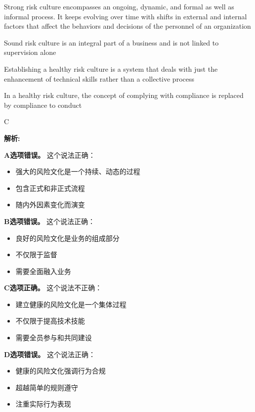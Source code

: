 \documentclass{article}
\newenvironment{explanation}
{\textbf{解析:}\par}
{\par}
\begin{document}
\begin{choices}
    \item Strong risk culture encompasses an ongoing, dynamic, and formal as well as informal process. It keeps evolving over time with shifts in external and internal factors that affect the behaviors and decisions of the personnel of an organization
    \item Sound risk culture is an integral part of a business and is not linked to supervision alone
    \item Establishing a healthy risk culture is a system that deals with just the enhancement of technical skills rather than a collective process
    \item In a healthy risk culture, the concept of complying with compliance is replaced by compliance to conduct
\end{choices}

\begin{correctanswer}
    C
\end{correctanswer}

\begin{explanation}
    \textbf{A选项错误。}
    这个说法正确：
    \begin{itemize}
        \item 强大的风险文化是一个持续、动态的过程
        \item 包含正式和非正式流程
        \item 随内外因素变化而演变
    \end{itemize}

    \textbf{B选项错误。}
    这个说法正确：
    \begin{itemize}
        \item 良好的风险文化是业务的组成部分
        \item 不仅限于监督
        \item 需要全面融入业务
    \end{itemize}

    \textbf{C选项正确。}
    这个说法不正确：
    \begin{itemize}
        \item 建立健康的风险文化是一个集体过程
        \item 不仅限于提高技术技能
        \item 需要全员参与和共同建设
    \end{itemize}

    \textbf{D选项错误。}
    这个说法正确：
    \begin{itemize}
        \item 健康的风险文化强调行为合规
        \item 超越简单的规则遵守
        \item 注重实际行为表现
    \end{itemize}
\end{explanation}
\end{document}
